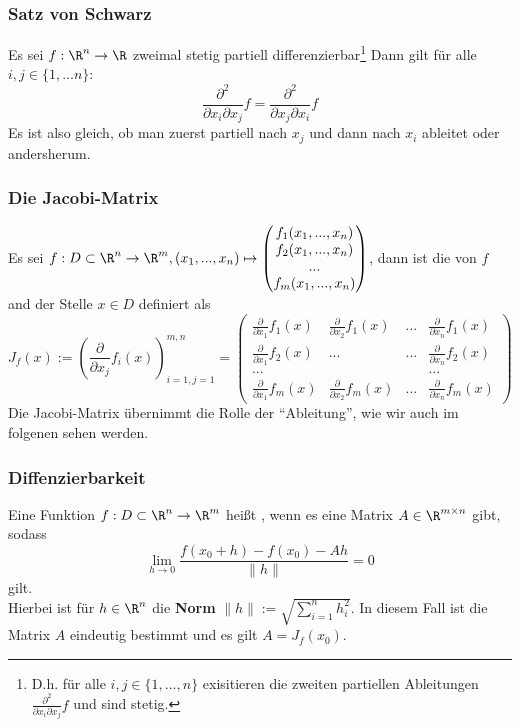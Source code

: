 %
%
\begin{frame}\frametitle{Satz von Schwarz}
Es sei $f: \R^n \to \R$ zweimal stetig partiell differenzierbar\footnote{D.h. für alle $i,j \in \{1,...,n\}$ exisitieren die zweiten partiellen Ableitungen $\frac{\partial^2}{\partial x_i \partial x_j}f$ und sind stetig.} Dann gilt für alle $i,j \in \{1,...n\}$:
$$
\frac{\partial^2}{\partial x_i \partial x_j}f = \frac{\partial^2}{\partial x_j \partial x_i}f
$$
Es ist also gleich, ob man zuerst partiell nach $x_j$ und dann nach $x_i$ ableitet oder andersherum.

\end{frame}
%
%
\begin{frame}\frametitle{Die Jacobi-Matrix}
Es sei $f: D \subset \R^n \to \R^m, (x_1,...,x_n) \mapsto \begin{pmatrix}f_1(x_1,...,x_n)\\ f_2(x_1,...,x_n)\\ ...\\f_m(x_1,...,x_n) \end{pmatrix}$, dann ist die  von $f$ and der Stelle $x \in D$ definiert als
$$
J_f(x):=\left(\frac{\partial}{\partial x_j}f_i(x)   \right)_{i=1,j=1}^{m,n} 
= \begin{pmatrix} \frac{\partial}{\partial x_1}f_1(x) &\frac{\partial}{\partial x_2}f_1(x) &...&\frac{\partial}{\partial x_n}f_1(x) \\
\frac{\partial}{\partial x_1}f_2(x) & ... & ... & \frac{\partial}{\partial x_n}f_2(x) \\ ...&&&...\\\frac{\partial}{\partial x_1}f_m(x)  & \frac{\partial}{\partial x_2}f_m(x)  & ... &\frac{\partial}{\partial x_n}f_m(x)  \end{pmatrix}
$$
Die Jacobi-Matrix übernimmt die Rolle der ``Ableitung'', wie wir auch im folgenen sehen werden.
\end{frame}
%
%
\begin{frame}\frametitle{Diffenzierbarkeit}
Eine Funktion $f: D \subset \R^n \to \R^m$ heißt , wenn es eine Matrix $A \in \R^{m \times n}$ gibt, sodass
$$
\lim_{h \to 0} \frac{f(x_0+h)-f(x_0)-Ah}{\|h\|}=0
$$
gilt.\\
Hierbei ist für $h \in \R^n$ die \textbf{Norm} $\|h\|:= \sqrt{\sum_{i=1}^n h_i^2}$.
\vfill \pause
In diesem Fall ist die Matrix $A$ eindeutig bestimmt und es gilt $A=J_f(x_0)$.
\end{frame}
%
%
